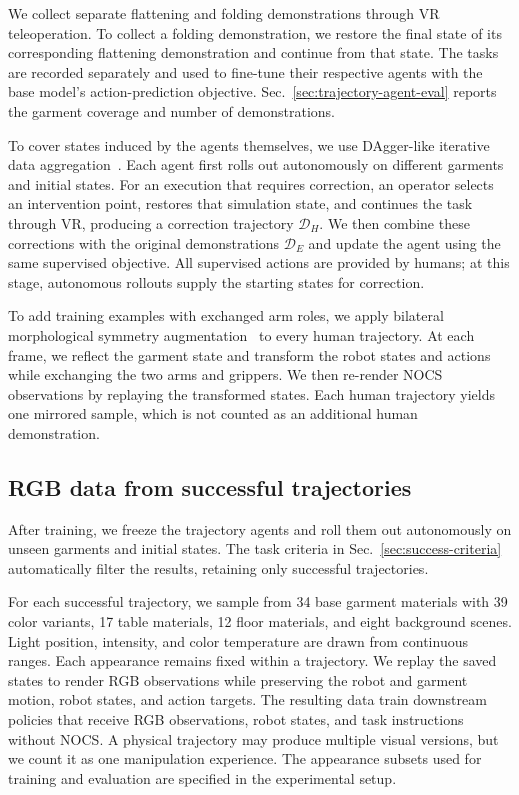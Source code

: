 We collect separate flattening and folding demonstrations through VR
teleoperation. To collect a folding demonstration, we restore the final state
of its corresponding flattening demonstration and continue from that state.
The tasks are recorded separately and used to fine-tune their respective
agents with the base model's action-prediction objective. Sec.~\ref{sec:trajectory-agent-eval}
reports the garment coverage and number of demonstrations.

To cover states induced by the agents themselves, we use DAgger-like iterative
data aggregation~\cite{DAgger}. Each agent first rolls out autonomously on
different garments and initial states. For an execution that requires
correction, an operator selects an intervention point, restores that simulation
state, and continues the task through VR, producing a correction trajectory
$\mathcal D_H$. We then combine these corrections with the original
demonstrations $\mathcal D_E$ and update the agent using the same supervised
objective. All supervised actions are provided by humans; at this stage,
autonomous rollouts supply the starting states for correction.

To add training examples with exchanged arm roles, we apply bilateral
morphological symmetry augmentation~\cite{GR-RL} to every human trajectory.
At each frame, we reflect the garment state and transform the robot states and
actions while exchanging the two arms and grippers. We then re-render NOCS
observations by replaying the transformed states. Each human trajectory yields
one mirrored sample, which is not counted as an additional human demonstration.

\subsection{RGB data from successful trajectories}

After training, we freeze the trajectory agents and roll them out
autonomously on unseen garments and initial states. The task criteria in
Sec.~\ref{sec:success-criteria} automatically filter the results, retaining only
successful trajectories.

For each successful trajectory, we sample from 34 base garment materials with
39 color variants, 17 table materials, 12 floor materials, and eight
background scenes. Light position, intensity, and color temperature are drawn
from continuous ranges. Each appearance remains fixed within a trajectory. We
replay the saved states to render RGB observations while preserving the robot
and garment motion, robot states, and action targets. The resulting data train
downstream policies that receive RGB observations, robot states, and task
instructions without NOCS. A physical trajectory may produce multiple visual
versions, but we count it as one manipulation experience. The appearance
subsets used for training and evaluation are specified in the experimental
setup.
